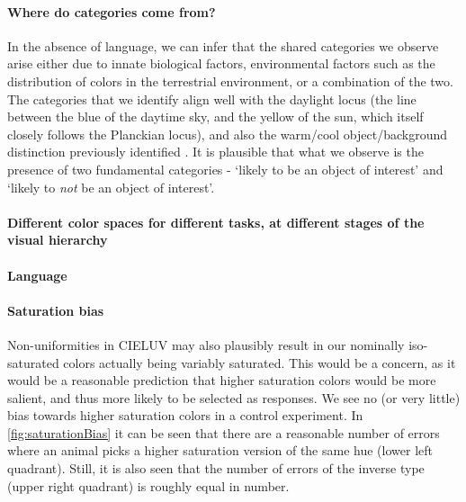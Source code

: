
\paragraph{Where do categories come from?}
In the absence of language, we can infer that the shared categories we observe arise either due to innate biological factors, environmental factors such as the distribution of colors in the terrestrial environment, or a combination of the two.
The categories that we identify align well with the daylight locus (the line between the blue of the daytime sky, and the yellow of the sun, which itself closely follows the Planckian locus), and also the warm/cool object/background distinction previously identified \citep{rosenthal_color_2018}. It is plausible that what we observe is the presence of two fundamental categories - `likely to be an object of interest' and `likely to \emph{not} be an object of interest'. 


\paragraph{Different color spaces for different tasks, at different stages of the visual hierarchy}

\paragraph{Language}


\begin{figure}

\caption{\textbf{}}
\label{fig:SamplingBias}
\end{figure}


\paragraph{Saturation bias}

Non-uniformities in CIELUV may also plausibly result in our nominally iso-saturated colors actually being variably saturated. This would be a concern, as it would be a reasonable prediction that higher saturation colors would be more salient, and thus more likely to be selected as responses. We see no (or very little) bias towards higher saturation colors in a control experiment. In \autoref{fig:saturationBias} it can be seen that there are a reasonable number of errors where an animal picks a higher saturation version of the same hue (lower left quadrant). Still, it is also seen that the number of errors of the inverse type (upper right quadrant) is roughly equal in number.


